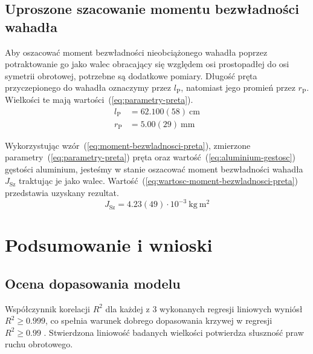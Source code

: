 \documentclass[twocolumn, a4paper, polish, 10pt]{article}
\newcommand{\JXn}[1]{\ensuremath{ J_{\mathrm{#1}} }}
\begin{document}
\subsection{Uproszone szacowanie momentu bezwładności wahadła}
Aby oszacować moment bezwładności nieobciążonego wahadła poprzez potraktowanie go jako walec obracający się względem osi prostopadłej do osi symetrii obrotowej, potrzebne są dodatkowe pomiary.
Długość pręta przyczepionego do wahadła oznaczymy przez $l_{\mathrm{P}}$, natomiast jego promień przez $r_{\mathrm{P}}$. Wielkości te mają wartości~(\ref{eq:parametry-preta}).
\begin{equation}
\begin{split}
    l_{\mathrm{P}} &= 62.100(58)~\mathrm{cm} \\
    r_{\mathrm{P}} &= 5.00(29)~\mathrm{mm} 
    \label{eq:parametry-preta}
\end{split}
\end{equation}

Wykorzystując wzór~(\ref{eq:moment-bezwladnosci-preta}), zmierzone parametry~(\ref{eq:parametry-preta}) pręta oraz wartość~(\ref{eq:aluminium-gestosc}) gęstości aluminium, jesteśmy w stanie oszacować moment bezwładności wahadła $\JXn{Sz}$ traktując je jako walec.
Wartość~(\ref{eq:wartosc-moment-bezwladnosci-preta}) przedstawia uzyskany rezultat.
\begin{equation}
    \JXn{Sz} = 4.23(49) \cdot 10^{-3}~\mathrm{kg~m^2}
    \label{eq:wartosc-moment-bezwladnosci-preta}
\end{equation}

\section{Podsumowanie i wnioski}
\subsection{Ocena dopasowania modelu}
Współczynnik korelacji $R^2$ dla każdej z 3 wykonanych regresji liniowych wyniósł $R^2 \ge 0.999$, co spełnia warunek dobrego dopasowania krzywej w regresji $R^2 \geq 0.99$ \cite{epa-8000d}.
Stwierdzona liniowość badanych wielkości potwierdza słuszność praw ruchu obrotowego.
\end{document}
